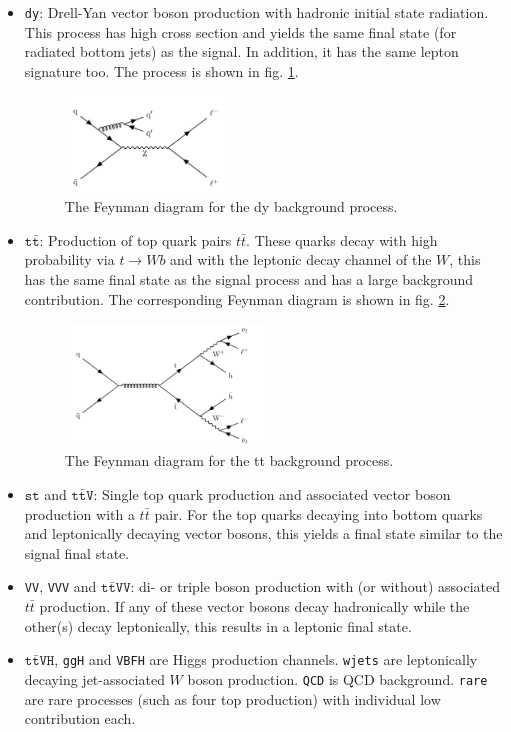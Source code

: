 \begin{itemize}
	\item[] \texttt{dy}: Drell-Yan vector boson production with hadronic initial state radiation. This process has high cross section and yields the same final state (for radiated bottom jets) as the signal. In addition, it has the same lepton signature too. The process is shown in fig. \ref{fig:dy_background}.
	\begin{figure}[h!]
		\centering
		\includegraphics[width=0.4\textwidth]{figures/analysis/dy.pdf}
		\caption{The Feynman diagram for the dy background process.}
		\label{fig:dy_background}
	\end{figure}
	\item[] $\texttt{t}\bar{\texttt{t}}$: Production of top quark pairs $t\bar{t}$. These quarks decay with high probability via $t\rightarrow Wb$ and with the leptonic decay channel of the $W$, this has the same final state as the signal process and has a large background contribution. The corresponding Feynman diagram is shown in fig. \ref{fig:tt_background}.
	\begin{figure}[h!]
		\centering
		\includegraphics[width=0.5\textwidth]{figures/analysis/tt.pdf}
		\caption{The Feynman diagram for the tt background process.}
		\label{fig:tt_background}
	\end{figure}
 	\item[] $\texttt{st}$ and $\texttt{t}\bar{\texttt{t}}\texttt{V}$: Single top quark production and associated vector boson production with a $t\bar{t}$ pair. For the top quarks decaying into bottom quarks and leptonically decaying vector bosons, this yields a final state similar to the signal final state.
	\item[] \texttt{VV}, \texttt{VVV} and $\texttt{t}{\bar{\texttt{t}}}\texttt{VV}$: di- or triple boson production with (or without) associated $t\bar{t}$ production. If any of these vector bosons decay hadronically while the other(s) decay leptonically, this results in a leptonic final state.
	\item[] $\texttt{t}\bar{\texttt{t}}\texttt{VH}$, \texttt{ggH} and \texttt{VBFH} are Higgs production channels. \texttt{wjets} are leptonically decaying jet-associated $W$ boson production. \texttt{QCD} is QCD background. \texttt{rare} are rare processes (such as four top production) with individual low contribution each.
\end{itemize}

